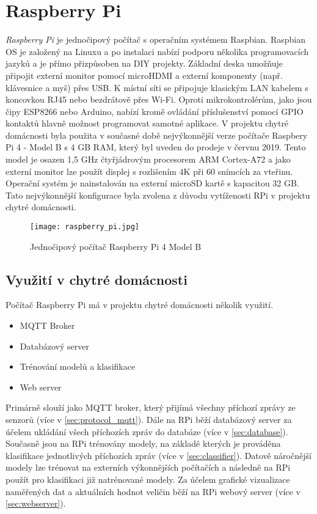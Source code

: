 \section{Raspberry Pi} \label{sec:raspberry_pi}
\textit{Raspberry Pi} je jednočipový počítač s operačním systémem Raspbian. Raspbian OS je založený na Linuxu a po instalaci nabízí podporu několika programovacích jazyků a je přímo přizpůsoben na DIY projekty. Základní deska umožňuje připojit externí monitor pomocí microHDMI a externí komponenty (např. klávesnice a myš) přes USB. K místní síti se připojuje klasickým LAN kabelem s koncovkou RJ45 nebo bezdrátově přes Wi-Fi. Oproti mikrokontrolérům, jako jsou čipy ESP8266 nebo Arduino, nabízí kromě ovládání příslušenství pomocí GPIO kontaktů hlavně možnost programovat samotné aplikace. V projektu chytré domácnosti byla použita v současné době nejvýkonnější verze počítače Raspbery Pi 4 - Model B s 4 GB RAM, který byl uveden do prodeje v červnu 2019. Tento model je osazen 1,5 GHz čtyřjádrovým procesorem ARM Cortex-A72 a jako externí monitor lze použít displej s rozlišením 4K při 60 snímcích za vteřinu. Operační systém je nainstalován na externí microSD kartě s kapacitou 32 GB. Tato nejvýkonnější konfigurace byla zvolena z důvodu vytíženosti RPi v projektu chytré domácnosti. 

\begin{figure}[H]
  \centering
  \texttt{[image: raspberry\_pi.jpg]}
  \caption{Jednočipový počítač Raspberry Pi 4 Model B}
  \label{fig:raspberry_pi}
\end{figure} 

\subsection*{Využití v chytré domácnosti}
Počítač Raspberry Pi má v projektu chytré domácnosti několik využití. 

\begin{itemize}
  \item MQTT Broker
  \item Databázový server
  \item Trénování modelů a klasifikace
  \item Web server
\end{itemize}

Primárně slouží jako MQTT broker, který přijímá všechny příchozí zprávy ze senzorů (více v \cref{sec:protocol_mqtt}). Dále na RPi běží databázový server za účelem ukládání všech příchozích zpráv do databáze (více v \cref{sec:database}). Současně jsou na RPi trénovány modely, na základě kterých je prováděna klasifikace jednotlivých příchozích zpráv (více v \cref{sec:classifier}). Datově náročnější modely lze trénovat na externích výkonnějších počítačích a následně na RPi použít pro klasifikaci již natrénované modely. Za účelem grafické vizualizace naměřených dat a aktuálních hodnot veličin běží na RPi webový server (více v \cref{sec:webserver}). 

